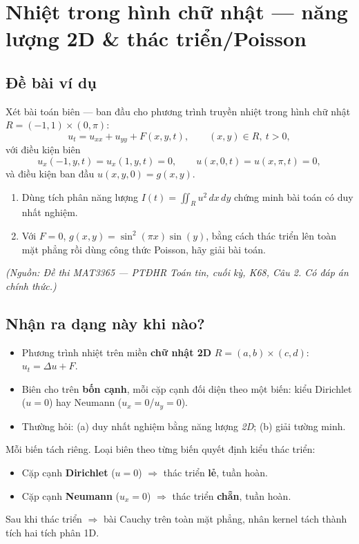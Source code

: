 
\section{Nhiệt trong hình chữ nhật --- năng lượng 2D \& thác triển/Poisson}

\subsection*{Đề bài ví dụ}

Xét bài toán biên --- ban đầu cho phương trình truyền nhiệt trong hình chữ nhật
$R=(-1,1)\times(0,\pi)$:
\[
  u_t = u_{xx} + u_{yy} + F(x,y,t), \qquad (x,y)\in R,\ t>0,
\]
với điều kiện biên
\[
  u_x(-1,y,t)=u_x(1,y,t)=0, \qquad u(x,0,t)=u(x,\pi,t)=0,
\]
và điều kiện ban đầu $u(x,y,0)=g(x,y)$.

\begin{enumerate}
\item[(a)] Dùng tích phân năng lượng $I(t)=\iint_R u^2\,dx\,dy$ chứng minh bài toán có duy nhất nghiệm.
\item[(b)] Với $F=0$, $g(x,y)=\sin^2(\pi x)\sin(y)$, bằng cách thác triển lên toàn mặt phẳng rồi dùng công thức Poisson, hãy giải bài toán.
\end{enumerate}

\emph{\small(Nguồn: Đề thi MAT3365 --- PTĐHR Toán tin, cuối kỳ, K68, Câu 2. Có đáp án chính thức.)}

\subsection*{Nhận ra dạng này khi nào?}

\begin{itemize}
\item Phương trình nhiệt trên miền \textbf{chữ nhật 2D} $R=(a,b)\times(c,d)$: $u_t=\Delta u+F$.
\item Biên cho trên \textbf{bốn cạnh}, mỗi cặp cạnh đối diện theo một biến: kiểu Dirichlet ($u=0$) hay Neumann ($u_x=0$/$u_y=0$).
\item Thường hỏi: (a) duy nhất nghiệm bằng năng lượng \emph{2D}; (b) giải tường minh.
\end{itemize}

\begin{meobox}
Mỗi biến tách riêng. Loại biên theo từng biến quyết định kiểu thác triển:
\begin{itemize}
\item Cặp cạnh \textbf{Dirichlet} ($u=0$) $\Rightarrow$ thác triển \textbf{lẻ}, tuần hoàn.
\item Cặp cạnh \textbf{Neumann} ($u_x=0$) $\Rightarrow$ thác triển \textbf{chẵn}, tuần hoàn.
\end{itemize}
Sau khi thác triển $\Rightarrow$ bài Cauchy trên toàn mặt phẳng, nhân kernel tách thành tích hai tích phân 1D.
\end{meobox}

